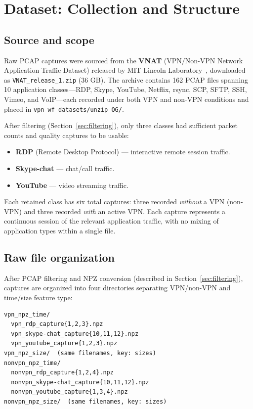 \documentclass[letterpaper,twocolumn,10pt]{article}
\begin{document}
\section{Dataset: Collection and Structure}

\subsection{Source and scope}
Raw PCAP captures were sourced from the \textbf{VNAT} (VPN/Non-VPN Network Application Traffic Dataset) released by MIT Lincoln Laboratory~\cite{iscx}, downloaded as \texttt{VNAT\_release\_1.zip} (36 GB). The archive contains 162 PCAP files spanning 10 application classes---RDP, Skype, YouTube, Netflix, rsync, SCP, SFTP, SSH, Vimeo, and VoIP---each recorded under both VPN and non-VPN conditions and placed in \texttt{vpn\_wf\_datasets/unzip\_OG/}.

After filtering (Section~\ref{sec:filtering}), only three classes had sufficient packet counts and quality captures to be usable:
\begin{itemize}[leftmargin=1.2em]
  \item \textbf{RDP} (Remote Desktop Protocol) --- interactive remote session traffic.
  \item \textbf{Skype-chat} --- chat/call traffic.
  \item \textbf{YouTube} --- video streaming traffic.
\end{itemize}
Each retained class has six total captures: three recorded \emph{without} a VPN (non-VPN) and three recorded \emph{with} an active VPN. Each capture represents a continuous session of the relevant application traffic, with no mixing of application types within a single file.

\subsection{Raw file organization}
After PCAP filtering and NPZ conversion (described in Section~\ref{sec:filtering}), captures are organized into four directories separating VPN/non-VPN and time/size feature type:

\begin{verbatim}
vpn_npz_time/
  vpn_rdp_capture{1,2,3}.npz
  vpn_skype-chat_capture{10,11,12}.npz
  vpn_youtube_capture{1,2,3}.npz
vpn_npz_size/  (same filenames, key: sizes)
nonvpn_npz_time/
  nonvpn_rdp_capture{1,2,4}.npz
  nonvpn_skype-chat_capture{10,11,12}.npz
  nonvpn_youtube_capture{1,3,4}.npz
nonvpn_npz_size/  (same filenames, key: sizes)
\end{verbatim}
\end{document}
